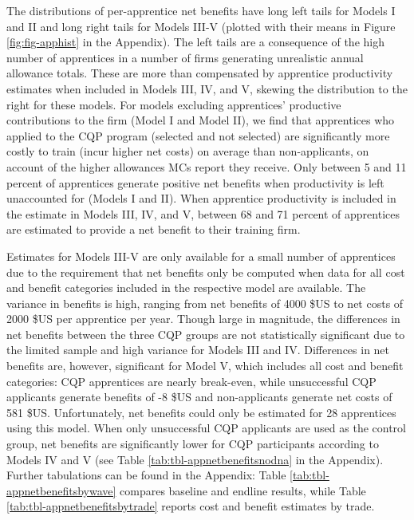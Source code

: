 \documentclass[
  a4paper, twoside, 12pt]{book}
\begin{document}
The distributions of per-apprentice net benefits have long left tails for Models I and II and long right tails for Models III-V (plotted with their means in Figure \ref{fig:fig-apphist} in the Appendix). The left tails are a consequence of the high number of apprentices in a number of firms generating unrealistic annual allowance totals. These are more than compensated by apprentice productivity estimates when included in Models III, IV, and V, skewing the distribution to the right for these models. For models excluding apprentices' productive contributions to the firm (Model I and Model II), we find that apprentices who applied to the CQP program (selected and not selected) are significantly more costly to train (incur higher net costs) on average than non-applicants, on account of the higher allowances MCs report they receive. Only between 5 and 11 percent of apprentices generate positive net benefits when productivity is left unaccounted for (Models I and II). When apprentice productivity is included in the estimate in Models III, IV, and V, between 68 and 71 percent of apprentices are estimated to provide a net benefit to their training firm.

Estimates for Models III-V are only available for a small number of apprentices due to the requirement that net benefits only be computed when data for all cost and benefit categories included in the respective model are available. The variance in benefits is high, ranging from net benefits of 4000 \$US to net costs of 2000 \$US per apprentice per year. Though large in magnitude, the differences in net benefits between the three CQP groups are not statistically significant due to the limited sample and high variance for Models III and IV. Differences in net benefits are, however, significant for Model V, which includes all cost and benefit categories: CQP apprentices are nearly break-even, while unsuccessful CQP applicants generate benefits of -8 \$US and non-applicants generate net costs of 581 \$US. Unfortunately, net benefits could only be estimated for 28 apprentices using this model. When only unsuccessful CQP applicants are used as the control group, net benefits are significantly lower for CQP participants according to Models IV and V (see Table \ref{tab:tbl-appnetbenefitsnodna} in the Appendix). Further tabulations can be found in the Appendix: Table \ref{tab:tbl-appnetbenefitsbywave} compares baseline and endline results, while Table \ref{tab:tbl-appnetbenefitsbytrade} reports cost and benefit estimates by trade.
\end{document}
